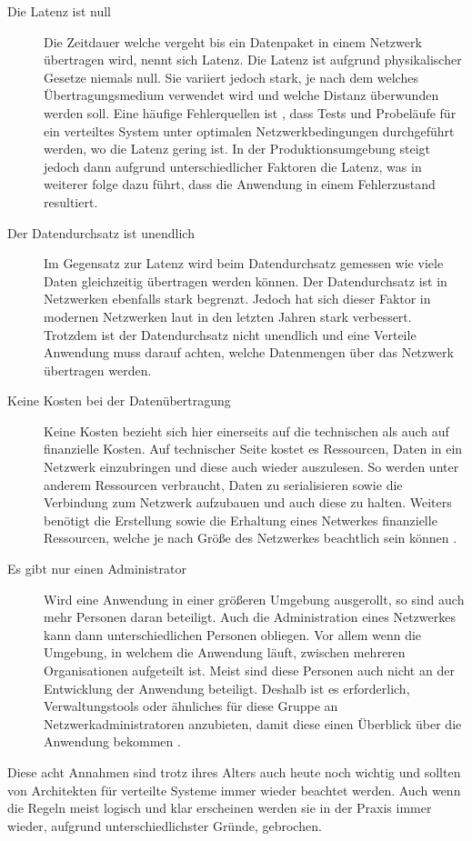 \begin{description}
    \item[Die Latenz ist null]
    Die Zeitdauer welche vergeht bis ein Datenpaket in einem Netzwerk übertragen wird, nennt sich Latenz. Die Latenz ist aufgrund physikalischer Gesetze niemals null. Sie variiert jedoch stark, je nach dem welches Übertragungsmedium verwendet wird und welche Distanz überwunden werden soll. Eine häufige  Fehlerquellen ist \cite{rotem2006fallacies}, dass Tests und Probeläufe für ein verteiltes System unter optimalen Netzwerkbedingungen durchgeführt werden, wo die Latenz gering ist. In der Produktionsumgebung steigt jedoch dann aufgrund unterschiedlicher Faktoren die Latenz, was in weiterer folge dazu führt, dass die Anwendung in einem Fehlerzustand resultiert. 
    \item[Der Datendurchsatz ist unendlich]
    Im Gegensatz zur Latenz wird beim Datendurchsatz gemessen wie viele Daten gleichzeitig übertragen werden können. Der Datendurchsatz ist in Netzwerken ebenfalls stark begrenzt. Jedoch hat sich dieser Faktor in modernen Netzwerken laut \cite{rotem2006fallacies} in den letzten Jahren stark verbessert. Trotzdem ist der Datendurchsatz nicht unendlich und eine Verteile Anwendung muss darauf achten, welche Datenmengen über das Netzwerk übertragen werden.  
    \item[Keine Kosten bei der Datenübertragung]
    Keine Kosten bezieht sich hier einerseits auf die technischen als auch auf finanzielle Kosten. Auf technischer Seite kostet es Ressourcen, Daten in ein Netzwerk einzubringen und diese auch wieder auszulesen. So werden unter anderem Ressourcen verbraucht, Daten zu serialisieren sowie die Verbindung zum Netzwerk aufzubauen und auch diese zu halten. Weiters benötigt die Erstellung sowie die Erhaltung eines Netwerkes finanzielle Ressourcen, welche je nach Größe des Netzwerkes beachtlich sein können \cite{rotem2006fallacies}.
    \item[Es gibt nur einen Administrator]
    Wird eine Anwendung in einer größeren Umgebung ausgerollt, so sind auch mehr Personen daran beteiligt. Auch die Administration eines Netzwerkes kann dann unterschiedlichen Personen obliegen. Vor allem wenn die Umgebung, in welchem die Anwendung läuft, zwischen mehreren Organisationen aufgeteilt ist. Meist sind diese Personen auch nicht an der Entwicklung der Anwendung beteiligt. Deshalb ist es erforderlich, Verwaltungstools oder ähnliches für diese Gruppe an Netzwerkadministratoren anzubieten, damit diese einen Überblick über die Anwendung bekommen \cite{rotem2006fallacies}.  
\end{description}
Diese acht Annahmen sind trotz ihres Alters auch heute noch wichtig und sollten von Architekten für verteilte Systeme immer wieder beachtet werden. Auch wenn die Regeln meist logisch und klar erscheinen werden sie in der Praxis immer wieder, aufgrund unterschiedlichster Gründe, gebrochen. \cite{rotem2006fallacies} 

